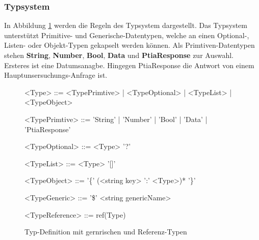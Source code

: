 \documentclass{article}
\begin{document}
    \subsubsection{Typsystem}
    In Abbildung \ref{Typsystem} werden die Regeln des Typsystem dargestellt.
    Das Typsystem unterstützt Primitive- und Generische-Datentypen, welche an einen Optional-, Listen- oder Objekt-Typen gekapselt werden können.
    Als Primtiven-Datentypen stehen \textbf{String}, \textbf{Number}, \textbf{Bool}, \textbf{Data} und \textbf{PtiaResponse} zur Auswahl.
    Ersteres ist eine Datumsanagbe. Hingegen PtiaResponse die Antwort von einem Hauptunsersuchungs-Anfrage ist.\\
    \begin{figure}[H]
        \begin{grammar}
            <Type> ::= <TypePrimtive> | <TypeOptional> | <TypeList> | <TypeObject>

            <TypePrimtive> ::= 'String' | 'Number' | 'Bool' | 'Data' | 'PtiaResponse'
            
            <TypeOptional> ::= <Type> '?'
            
            <TypeList> ::= <Type> '[]'
            
            <TypeObject> ::= '\{' (<string key> ':' <Type>)* '\}'

            <TypeGeneric> ::= '\$' <string genericName>

            <TypeReference> ::= ref(Type)
        \end{grammar}
        \caption{Typ-Definition mit gernrischen und Referenz-Typen}
        \label{Typsystem}
    \end{figure}
\end{document}
